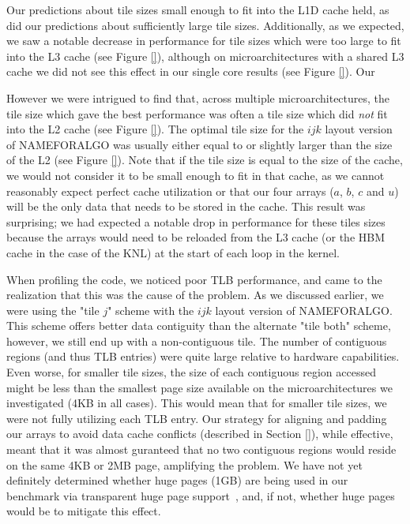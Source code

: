\documentclass[conference]{IEEEtran}
\begin{document}
Our predictions about tile sizes small enough to fit into the L1D cache held,
as did our predictions about sufficiently large tile sizes. Additionally, as we
expected, we saw a notable decrease in performance for tile sizes which were
too large to fit into the L3 cache (see Figure \ref{}), although on
microarchitectures with a shared L3 cache we did not see this effect in our
single core results (see Figure \ref{}). Our 

However we were intrigued to find that, across multiple microarchitectures, the
tile size which gave the best performance was often a tile size which did
\emph{not} fit into the L2 cache (see Figure \ref{}). The optimal tile size for
the \(ijk\) layout version of NAMEFORALGO was usually either equal to or
slightly larger than the size of the L2 (see Figure \ref{}). Note that if the
tile size is equal to the size of the cache, we would not consider it to be
small enough to fit in that cache, as we cannot reasonably expect perfect cache
utilization or that our four arrays (\(a\), \(b\), \(c\) and \(u\)) will be the
only data that needs to be stored in the cache. This result was surprising; we
had expected a notable drop in performance for these tiles sizes because the
arrays would need to be reloaded from the L3 cache (or the HBM cache in the
case of the KNL) at the start of each loop in the kernel. 

When profiling the code, we noticed poor TLB performance, and came to the
realization that this was the cause of the problem. As we discussed earlier, we
were using the "tile \(j\)" scheme with the \(ijk\) layout version of
NAMEFORALGO. This scheme offers better data contiguity than the alternate "tile
both" scheme, however, we still end up with a non-contiguous tile.  The number
of contiguous regions (and thus TLB entries) were quite large relative to
hardware capabilities. Even worse, for smaller tile sizes, the size of each
contiguous region accessed might be less than the smallest page size available
on the microarchitectures we investigated (4KB in all cases). This would mean
that for smaller tile sizes, we were not fully utilizing each TLB entry.  Our
strategy for aligning and padding our arrays to avoid data cache conflicts
(described in Section \ref{}), while effective, meant that it was almost
guranteed that no two contiguous regions would reside on the same 4KB or 2MB
page, amplifying the problem. We have not yet definitely determined whether
huge pages (1GB) are being used in our benchmark via transparent huge page
support~\cite{}, and, if not, whether huge pages would be to mitigate this
effect.
\end{document}
